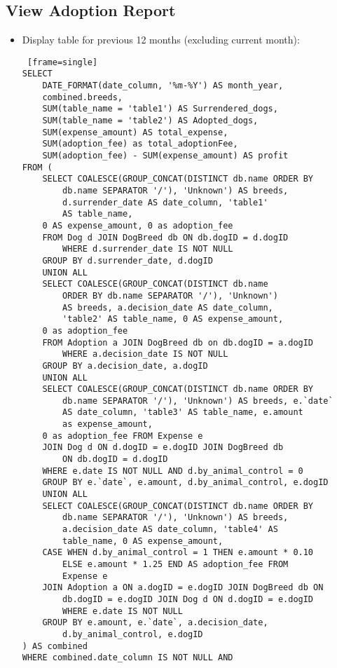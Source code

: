 \documentclass{article}
\begin{document}
\subsection{View Adoption Report}
\begin{itemize}
\item Display table for previous 12 months (excluding current month):
\begin{Verbatim} [frame=single]
SELECT 
    DATE_FORMAT(date_column, '%m-%Y') AS month_year,
    combined.breeds,
    SUM(table_name = 'table1') AS Surrendered_dogs,
    SUM(table_name = 'table2') AS Adopted_dogs,
    SUM(expense_amount) AS total_expense,
    SUM(adoption_fee) as total_adoptionFee,
    SUM(adoption_fee) - SUM(expense_amount) AS profit
FROM (
    SELECT COALESCE(GROUP_CONCAT(DISTINCT db.name ORDER BY 
        db.name SEPARATOR '/'), 'Unknown') AS breeds, 
        d.surrender_date AS date_column, 'table1' 
        AS table_name,
    0 AS expense_amount, 0 as adoption_fee 
    FROM Dog d JOIN DogBreed db ON db.dogID = d.dogID 
        WHERE d.surrender_date IS NOT NULL
    GROUP BY d.surrender_date, d.dogID
    UNION ALL
    SELECT COALESCE(GROUP_CONCAT(DISTINCT db.name 
        ORDER BY db.name SEPARATOR '/'), 'Unknown') 
        AS breeds, a.decision_date AS date_column, 
        'table2' AS table_name, 0 AS expense_amount, 
    0 as adoption_fee 
    FROM Adoption a JOIN DogBreed db on db.dogID = a.dogID 
        WHERE a.decision_date IS NOT NULL
    GROUP BY a.decision_date, a.dogID
    UNION ALL
    SELECT COALESCE(GROUP_CONCAT(DISTINCT db.name ORDER BY 
        db.name SEPARATOR '/'), 'Unknown') AS breeds, e.`date` 
        AS date_column, 'table3' AS table_name, e.amount 
        as expense_amount, 
    0 as adoption_fee FROM Expense e 
    JOIN Dog d ON d.dogID = e.dogID JOIN DogBreed db 
        ON db.dogID = d.dogID
    WHERE e.date IS NOT NULL AND d.by_animal_control = 0
    GROUP BY e.`date`, e.amount, d.by_animal_control, e.dogID
    UNION ALL
    SELECT COALESCE(GROUP_CONCAT(DISTINCT db.name ORDER BY 
        db.name SEPARATOR '/'), 'Unknown') AS breeds,
        a.decision_date AS date_column, 'table4' AS 
        table_name, 0 AS expense_amount,
    CASE WHEN d.by_animal_control = 1 THEN e.amount * 0.10 
        ELSE e.amount * 1.25 END AS adoption_fee FROM 
        Expense e 
    JOIN Adoption a ON a.dogID = e.dogID JOIN DogBreed db ON 
        db.dogID = e.dogID JOIN Dog d ON d.dogID = e.dogID 
        WHERE e.date IS NOT NULL
    GROUP BY e.amount, e.`date`, a.decision_date, 
        d.by_animal_control, e.dogID
) AS combined
WHERE combined.date_column IS NOT NULL AND 

\end{Verbatim}
\end{itemize}
\end{document}
